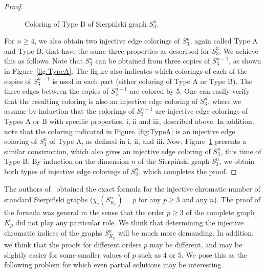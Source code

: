 \documentclass{article}
\begin{document}
\begin{proof}
\begin{figure}[h!]
\caption{Coloring of Type B of Sierpi\'nski graph $S_3^n$.}
\label{fig:TypeB}
\end{figure}        



For $n\ge 4$, we also obtain two injective edge colorings of $S_3^n$, again called Type A and Type B, that have the same three properties as described for $S_3^3$. We achieve this as follows. Note that $S_3^n$ can be obtained from three copies of $S_3^{n-1}$, as shown in Figure~\ref{fig:TypeA}. The figure also indicates which colorings of each of the copies of $S_3^{n-1}$ is used in each part (either coloring of Type A or Type B). The three edges between the copies of $S_3^{n-1}$ are colored by $5$. One can easily verify that the resulting coloring is also an injective edge coloring of $S_3^{n}$, where we assume by induction that the colorings of $S_3^{n-1}$ are injective edge colorings of Types A or B with specific properties, i, ii and iii, described above. In addition, note that the coloring indicated in Figure~\ref{fig:TypeA} is an injective edge coloring of $S_3^n$ of Type A, as defined in i, ii, and iii. 
Now, Figure~\ref{fig:TypeB} presents a similar construction, which also gives an injective edge coloring of $S_3^n$, this time of Type B. By induction on the dimension $n$ of the Sierpi\'{n}ski graph $S_3^n$, we obtain both types of injective edge colorings of $S_3^{n}$, which completes the proof.\end{proof}

The authors of~\cite{bksy} obtained the exact formula for the injective chromatic number of standard Sierpi\' nski graphs ($\chi_i(S_{K_p}^n)=p$ for any $p\ge 3$ and any $n$). The proof of the formula was general in the sense that the order $p\ge 3$ of the complete graph $K_p$ did not play any particular role. We think that determining the injective chromatic indices of the graphs $S_{K_p}^n$ will be much more demanding. In addition, we think that the proofs for different orders $p$ may be different, and may be slightly easier for some smaller values of $p$ such as $4$ or $5$. We pose this as the following problem for which even partial solutions may be interesting. 
\end{document}
